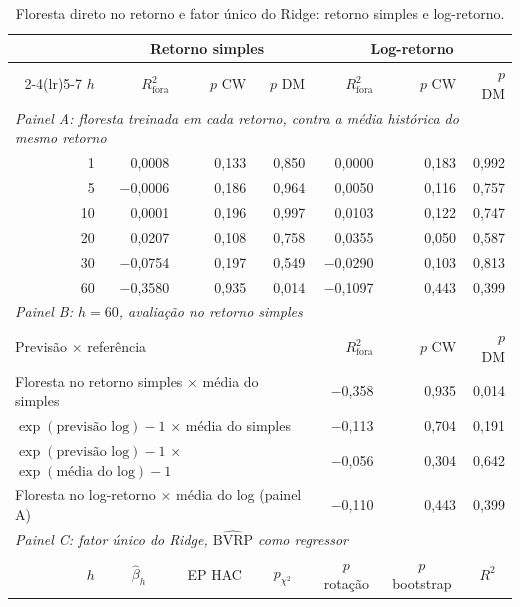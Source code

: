 \begin{table}[H]
\centering
\footnotesize
\caption{Floresta direto no retorno e fator único do Ridge: retorno simples e log-retorno.}
\label{tab:apb2-ponte-retorno}
\begin{tabular}{rrrrrrr}
\toprule
 & \multicolumn{3}{c}{Retorno simples} & \multicolumn{3}{c}{Log-retorno} \\ \cmidrule(lr){2-4}\cmidrule(lr){5-7}
$h$ & $R^2_{\text{fora}}$ & $p$ CW & $p$ DM & $R^2_{\text{fora}}$ & $p$ CW & $p$ DM \\
\midrule
\multicolumn{7}{l}{\textit{Painel A: floresta treinada em cada retorno, contra a média histórica do mesmo retorno}} \\
1 & 0{,}0008 & 0{,}133 & 0{,}850 & 0{,}0000 & 0{,}183 & 0{,}992 \\
5 & $-$0{,}0006 & 0{,}186 & 0{,}964 & 0{,}0050 & 0{,}116 & 0{,}757 \\
10 & 0{,}0001 & 0{,}196 & 0{,}997 & 0{,}0103 & 0{,}122 & 0{,}747 \\
20 & 0{,}0207 & 0{,}108 & 0{,}758 & 0{,}0355 & 0{,}050 & 0{,}587 \\
30 & $-$0{,}0754 & 0{,}197 & 0{,}549 & $-$0{,}0290 & 0{,}103 & 0{,}813 \\
60 & $-$0{,}3580 & 0{,}935 & 0{,}014 & $-$0{,}1097 & 0{,}443 & 0{,}399 \\
\midrule
\multicolumn{7}{l}{\textit{Painel B: $h = 60$, avaliação no retorno simples}} \\
\multicolumn{4}{l}{Previsão $\times$ referência} & $R^2_{\text{fora}}$ & $p$ CW & $p$ DM \\
\multicolumn{4}{l}{Floresta no retorno simples $\times$ média do simples} & $-$0{,}358 & 0{,}935 & 0{,}014 \\
\multicolumn{4}{l}{$\exp(\text{previsão log}) - 1$ $\times$ média do simples} & $-$0{,}113 & 0{,}704 & 0{,}191 \\
\multicolumn{4}{l}{$\exp(\text{previsão log}) - 1$ $\times$ $\exp(\text{média do log}) - 1$} & $-$0{,}056 & 0{,}304 & 0{,}642 \\
\multicolumn{4}{l}{Floresta no log-retorno $\times$ média do log (painel A)} & $-$0{,}110 & 0{,}443 & 0{,}399 \\
\midrule
\multicolumn{7}{l}{\textit{Painel C: fator único do Ridge, $\widehat{\text{BVRP}}$ como regressor}} \\
$h$ & \multicolumn{1}{c}{$\hat\beta_h$} & \multicolumn{1}{c}{EP HAC} & \multicolumn{1}{c}{$p_{\chi^2}$} & \multicolumn{1}{c}{$p$ rotação} & \multicolumn{1}{c}{$p$ bootstrap} & \multicolumn{1}{c}{$R^2$} \\

\end{tabular}
\end{table}
